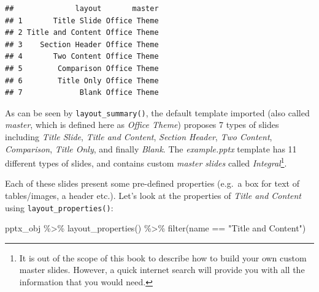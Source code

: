 \documentclass[
]{krantz}
\makeatletter
\newenvironment{Shaded}{\begin{snugshade}}{\end{snugshade}}
\newcommand{\FunctionTok}[1]{\textcolor[rgb]{0,0,0}{#1}}
\newcommand{\NormalTok}[1]{#1}
\newcommand{\SpecialCharTok}[1]{\textcolor[rgb]{0,0,0}{#1}}
\newcommand{\StringTok}[1]{\textcolor[rgb]{0.5,0.5,0.5}{#1}}
\newenvironment{kframe}{%
\medskip{}
\setlength{\fboxsep}{.8em}
 \def\at@end@of@kframe{}%
 \ifinner\ifhmode%
  \def\at@end@of@kframe{\end{minipage}}%
  \begin{minipage}{\columnwidth}%
 \fi\fi%
 \def\FrameCommand##1{\hskip\@totalleftmargin \hskip-\fboxsep
 \colorbox{shadecolor}{##1}\hskip-\fboxsep
     \hskip-\linewidth \hskip-\@totalleftmargin \hskip\columnwidth}%
 \MakeFramed {\advance\hsize-\width
   \@totalleftmargin\z@ \linewidth\hsize
   \@setminipage}}%
 {\par\unskip\endMakeFramed%
 \at@end@of@kframe}
\renewenvironment{Shaded}{\begin{kframe}}{\end{kframe}}
\makeatother
\begin{document}
\begin{verbatim}
##              layout       master
## 1       Title Slide Office Theme
## 2 Title and Content Office Theme
## 3    Section Header Office Theme
## 4       Two Content Office Theme
## 5        Comparison Office Theme
## 6        Title Only Office Theme
## 7             Blank Office Theme
\end{verbatim}

As can be seen by \texttt{layout\_summary()}, the default template imported (also called \emph{master}, which is defined here as \emph{Office Theme}) proposes 7 types of slides including \emph{Title Slide}, \emph{Title and Content}, \emph{Section Header}, \emph{Two Content}, \emph{Comparison}, \emph{Title Only}, and finally \emph{Blank}. The \emph{example.pptx} template has 11 different types of slides, and contains custom \emph{master slides} called \emph{Integral}\footnote{It is out of the scope of this book to describe how to build your own custom master slides. However, a quick internet search will provide you with all the information that you would need.}.

Each of these slides present some pre-defined properties (e.g.~a box for text of tables/images, a header etc.). Let's look at the properties of \emph{Title and Content} using \texttt{layout\_properties()}:

\begin{Shaded}
\begin{Highlighting}[]
\NormalTok{pptx\_obj }\SpecialCharTok{\%\textgreater{}\%} 
  \FunctionTok{layout\_properties}\NormalTok{() }\SpecialCharTok{\%\textgreater{}\%} 
  \FunctionTok{filter}\NormalTok{(name }\SpecialCharTok{==} \StringTok{"Title and Content"}\NormalTok{)}
\end{Highlighting}
\end{Shaded}
\end{document}

